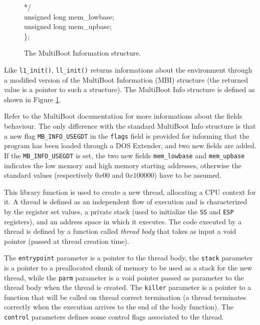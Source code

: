 \documentclass[a4paper]{report}
\begin{document}
\begin{figure}
\begin{tt}
\begin{tabbing}
 */                                                                      \\
\>      unsigned long mem\_lowbase;                                     \\
\>      unsigned long mem\_upbase;                                      \\
\};                                                                     \\
\end{tabbing}
\end{tt}
\caption{The MultiBoot Information structure.}
\label{fig:MBI}
\end{figure}
Like {\tt l1\_init()}, {\tt ll\_init()} returns informations about
the environment
through a modified version of the MultiBoot Information (MBI)
structure (the returned value is a pointer to such a structure). The
MultiBoot Info structure is defined as shown in Figure \ref{fig:MBI}.

Refer to the MultiBoot documentation for more informations about the
fields behaviour. The only difference with the standard MultiBoot
Info structure is that a new flag {\tt MB\_INFO\_USEGDT} in the
{\tt flags} field is provided for informing that the program has been
loaded through a DOS Extender, and two new fields are added. If the
{\tt MB\_INFO\_USEGDT} is set, the two new fields {\tt mem\_lowbase}
and {\tt mem\_upbase} indicates the low memory and high memory
starting addresses, otherwise the standard values (respectively
$0x00$ and $0x100000$) have to be assumed.


This library function is used to create a new thread, allocating a
CPU context for it. A thread is defined as an independent flow of
execution and is characterized by the register set values, a private
stack (used to initialize the {\tt SS} and {\tt ESP} registers), and
an address space in which it executes. The code executed by a thread
is defined by a function called {\em thread body} that takes as input
a void pointer (passed at thread creation time).

The {\tt entrypoint} parameter is a pointer to the thread body, the
{\tt stack} parameter is a pointer to a preallocated chunk of memory
to be used as a stack for the new thread, while the {\tt parm}
parameter is a void pointer passed as parameter to the thread body
when the thread is created. The {\tt killer} parameter is a pointer
to a function that will be called on thread correct termination (a
thread terminates correctly when the execution arrives to the end of
the body function). The {\tt control} parameters defines some control
flags associated to the thread.
\end{document}
